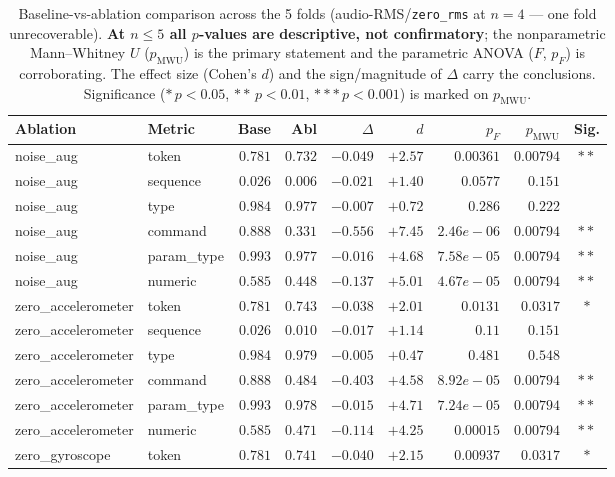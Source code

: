 \begin{table}[!htbp]
\centering
\caption{Baseline-vs-ablation comparison across the 5 folds (audio-RMS/\texttt{zero\_rms} at $n=4$ --- one fold unrecoverable). \textbf{At $n\!\le\!5$ all $p$-values are descriptive, not confirmatory}; the nonparametric Mann--Whitney $U$ ($p_{\mathrm{MWU}}$) is the primary statement and the parametric ANOVA ($F$, $p_F$) is corroborating. The effect size (Cohen's $d$) and the sign/magnitude of $\Delta$ carry the conclusions. Significance ($\ast\,p<0.05$, $\ast\ast\,p<0.01$, $\ast\ast\ast\,p<0.001$) is marked on $p_{\mathrm{MWU}}$.}
\label{tab:anova}
\scriptsize
\begin{tabular}{l l r r r r r r c}
\toprule
Ablation & Metric & Base & Abl & $\Delta$ & $d$ & $p_F$ & $p_{\mathrm{MWU}}$ & Sig. \\
\midrule
noise\_aug & token & $0.781$ & $0.732$ & $-0.049$ & $+2.57$ & $0.00361$ & $0.00794$ & $\ast\ast$ \\
noise\_aug & sequence & $0.026$ & $0.006$ & $-0.021$ & $+1.40$ & $0.0577$ & $0.151$ &  \\
noise\_aug & type & $0.984$ & $0.977$ & $-0.007$ & $+0.72$ & $0.286$ & $0.222$ &  \\
noise\_aug & command & $0.888$ & $0.331$ & $-0.556$ & $+7.45$ & $2.46e-06$ & $0.00794$ & $\ast\ast$ \\
noise\_aug & param\_type & $0.993$ & $0.977$ & $-0.016$ & $+4.68$ & $7.58e-05$ & $0.00794$ & $\ast\ast$ \\
noise\_aug & numeric & $0.585$ & $0.448$ & $-0.137$ & $+5.01$ & $4.67e-05$ & $0.00794$ & $\ast\ast$ \\
zero\_accelerometer & token & $0.781$ & $0.743$ & $-0.038$ & $+2.01$ & $0.0131$ & $0.0317$ & $\ast$ \\
zero\_accelerometer & sequence & $0.026$ & $0.010$ & $-0.017$ & $+1.14$ & $0.11$ & $0.151$ &  \\
zero\_accelerometer & type & $0.984$ & $0.979$ & $-0.005$ & $+0.47$ & $0.481$ & $0.548$ &  \\
zero\_accelerometer & command & $0.888$ & $0.484$ & $-0.403$ & $+4.58$ & $8.92e-05$ & $0.00794$ & $\ast\ast$ \\
zero\_accelerometer & param\_type & $0.993$ & $0.978$ & $-0.015$ & $+4.71$ & $7.24e-05$ & $0.00794$ & $\ast\ast$ \\
zero\_accelerometer & numeric & $0.585$ & $0.471$ & $-0.114$ & $+4.25$ & $0.00015$ & $0.00794$ & $\ast\ast$ \\
zero\_gyroscope & token & $0.781$ & $0.741$ & $-0.040$ & $+2.15$ & $0.00937$ & $0.0317$ & $\ast$ \\

\end{tabular}
\end{table}

